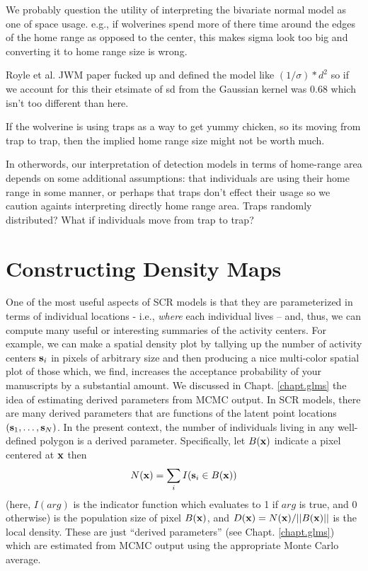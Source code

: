 We probably
question the utility of interpreting the 
bivariate normal model as one of space usage. e.g., if wolverines
spend more of there time around the edges of the home range as opposed
to the center, this makes sigma look too big and converting it to home
range size is wrong.

Royle et al. JWM paper fucked up and defined the model like
$(1/\sigma)*d^2$ so if we account for this their etsimate of sd from
the Gaussian kernel was 0.68 which isn't too different than here. 

If the wolverine is using traps as a way to get yummy chicken, so its
moving from trap to trap, then the implied home range size might not
be worth much. 

In otherwords, our interpretation of detection models in terms of
home-range area depends on some additional assumptions: that
individuals are using their home range in some manner, or perhaps that
traps don't effect their usage so we caution againts interpreting
directly home range area. Traps randomly distributed?
What if individuals move from trap to trap?





\section{Constructing Density Maps}
\label{scr0.sec.mapping}

One of the most useful aspects of SCR models is that they are
parameterized in terms of individual locations - i.e., {\it where}
each individual lives -- and, thus, we can compute many useful or
interesting summaries of the activity centers.  For example, we can
make a spatial density plot by tallying up the number of activity
centers ${\bf s}_{i}$ in pixels  of arbitrary size and then producing a
nice multi-color spatial plot of those which, we find, increases the
acceptance probability of your manuscripts by a substantial amount.
We discussed in Chapt. \ref{chapt.glms} the idea of estimating derived
parameters from MCMC output. In SCR models, there are many derived
parameters that are functions of the latent point locations $({\bf
  s}_{1},\ldots, {\bf s}_{N})$. In the present context, the number of
individuals living in any well-defined polygon is a derived
parameter. Specifically, let $B({\bf x})$ indicate a pixel centered at
${\bf x}$ then
\[
N({\bf x})=\sum_{i} I({\bf s}_{i} \in B({\bf x}))
\]
(here, $I(arg)$ is the indicator function which evaluates to 1 if
$arg$ is true, and 0 otherwise)
is the population size of pixel  $B({\bf x})$, and $D({\bf x}) = N({\bf
  x})/||B({\bf x})||$ is the local density. 
These are just ``derived
parameters'' (see Chapt.  \ref{chapt.glms}) which are estimated from
MCMC output using the appropriate Monte Carlo average. 


